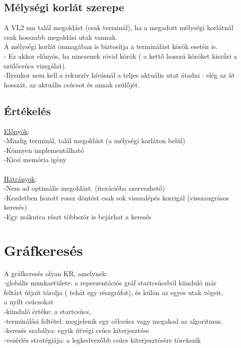 \documentclass{article}
\begin{document}
	 \subsection{Mélységi korlát szerepe}
	 A VL2 nm talál megoldást (csak terminál), ha a megadott mélységi korlátnál csak hosszabb megoldási utak vannak. \\
	 A mélységi korlát önmagában is biztosítja a terminálást körök esetén is. \\
	 - Ez akkor előnyös, ha nincsenek rövid körök ( a kettő hosszú köröket kiszűri a szülőcsúcs vizsgálat).\\
	 -Ilyenkor nem kell a rekurzív hívásnál a teljes aktuális utat átadni : elég az út hosszát, az aktuális csúcsot és annak szülőjét.
	 
	 \subsection{Értékelés}
	 \underline{Előnyök}: \\
	 -Mindig terminál, talál megoldást (a mélységi korláton belül)\\
	 -Könnyen implementálható \\
	 -Kicsi memória igény \\ \\
	 \underline{Hátrányok}: \\
	 -Nem ad optimális megoldást. (iterációba szervezhető)\\
	 -Kezdetben hozott rossz döntést csak sok visszalépés korrigál (visszaugrásos keresés) \\
	 -Egy zsákutca részt többször is bejárhat a keresés \\
	 
	 \section{Gráfkeresés}
	 A gráfkeresés olyan KR, amelynek:\\
	 \hspace*{1em} -globális munkaetülete: a reprezentációs gráf startcsúcsból kiinduló már\\
	 \hspace*{1em} feltárt útjait tárolja ( tehát egy részgráfot), és külön az egyes utak végeit, \\
	 \hspace*{1em} a nyílt csúcsokat\\
	 \hspace*{2em} -kiinduló értéke: a startcsúcs,\\
	 \hspace*{2em} -terminálási feltétel: megjelenik egy célcsúcs vagy megakad az algoritmus.\\
	 \hspace*{1em} -keresés szabálya: egyik útvégi csúcs kiterjesztése\\
	 \hspace*{1em} -vezérlés stratégiája: a legkedvezőbb csúcs kiterjesztésére törekszik
	 
\end{document}
